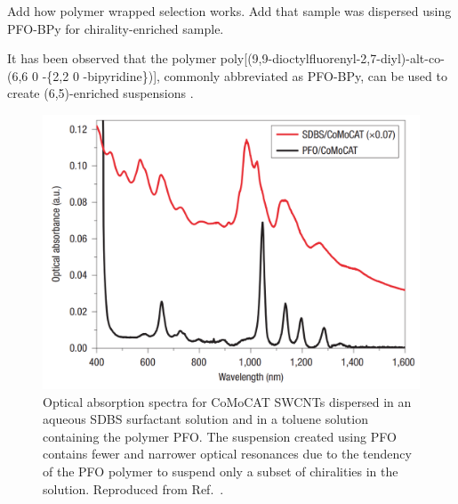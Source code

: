 {\color{red} Add how polymer wrapped selection works. Add that sample was dispersed using PFO-BPy for chirality-enriched sample.}

It has been observed that the polymer poly[(9,9-dioctylfluorenyl-2,7-diyl)-alt-co-(6,6 0 -\{2,2 0 -bipyridine\})], commonly abbreviated as PFO-BPy, can be used to create (6,5)-enriched suspensions \cite{hertel2010diffusion, ozawa2011one, gomulya2013conjugated}.

\begin{figure}[H]
	\centering
	\includegraphics[scale=1.4]{images/chapter_methods/purification_nish_2}
	\caption{Optical absorption spectra for CoMoCAT SWCNTs dispersed in an aqueous SDBS surfactant solution and in a toluene solution containing the polymer PFO. The suspension created using PFO contains fewer and narrower optical resonances due to the tendency of the PFO polymer to suspend only a subset of chiralities in the solution. Reproduced from Ref.\ \cite{nish2007highly}. }
	\label{fig:comparison_nish}
\end{figure}


